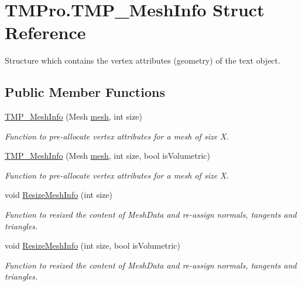 \hypertarget{struct_t_m_pro_1_1_t_m_p___mesh_info}{}\section{T\+M\+Pro.\+T\+M\+P\+\_\+\+Mesh\+Info Struct Reference}
\label{struct_t_m_pro_1_1_t_m_p___mesh_info}


Structure which contains the vertex attributes (geometry) of the text object.  


\subsection*{Public Member Functions}
\begin{DoxyCompactItemize}
\item 
\mbox{\hyperlink{struct_t_m_pro_1_1_t_m_p___mesh_info_a457cf31e803ba04bcbc37a88fe70ab12}{T\+M\+P\+\_\+\+Mesh\+Info}} (Mesh \mbox{\hyperlink{struct_t_m_pro_1_1_t_m_p___mesh_info_a2b53d43187ab86ccefe3f5dd6babcfef}{mesh}}, int size)
\begin{DoxyCompactList}\small\item\em Function to pre-\/allocate vertex attributes for a mesh of size X. \end{DoxyCompactList}\item 
\mbox{\hyperlink{struct_t_m_pro_1_1_t_m_p___mesh_info_a34bbcd82d7626fdc9d7598eac632f2b9}{T\+M\+P\+\_\+\+Mesh\+Info}} (Mesh \mbox{\hyperlink{struct_t_m_pro_1_1_t_m_p___mesh_info_a2b53d43187ab86ccefe3f5dd6babcfef}{mesh}}, int size, bool is\+Volumetric)
\begin{DoxyCompactList}\small\item\em Function to pre-\/allocate vertex attributes for a mesh of size X. \end{DoxyCompactList}\item 
void \mbox{\hyperlink{struct_t_m_pro_1_1_t_m_p___mesh_info_ac2631e006b2107ce543716541a48e5d1}{Resize\+Mesh\+Info}} (int size)
\begin{DoxyCompactList}\small\item\em Function to resized the content of Mesh\+Data and re-\/assign normals, tangents and triangles. \end{DoxyCompactList}\item 
void \mbox{\hyperlink{struct_t_m_pro_1_1_t_m_p___mesh_info_a4948f8abff302bcc8b6ea6cfc2f0af3d}{Resize\+Mesh\+Info}} (int size, bool is\+Volumetric)
\begin{DoxyCompactList}\small\item\em Function to resized the content of Mesh\+Data and re-\/assign normals, tangents and triangles. \end{DoxyCompactList}\item 

\end{DoxyCompactItemize}
